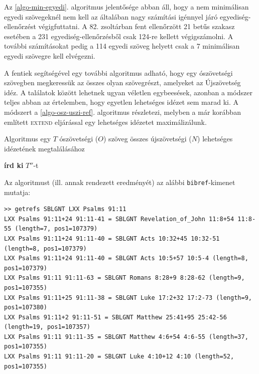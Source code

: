 \documentclass{article}
\begin{document}
Az \ref{algo-min-egyedi}. algoritmus jelentősége abban áll, hogy a nem minimálisan egyedi
szövegeknél nem kell az általában nagy számítási igénnyel járó egyediség-ellenőrzést
végigfuttatni. A 82. zsoltárban fent ellenőrzött 21 betűs szakasz esetében a 231 egyediség-ellenőrzésből
csak 124-re kellett végigszámolni. A további számításokat pedig a 114 egyedi szöveg helyett
csak a 7 minimálisan egyedi szövegre kell elvégezni.

A fentiek segítségével egy további algoritmus adható, hogy egy ószövetségi szövegben megkeressük
az összes olyan szövegrészt, amelyeket az Újszövetség idéz. A találatok között lehetnek
ugyan véletlen egybeesések, azonban a módszer teljes abban az értelemben, hogy egyetlen
lehetséges idézet sem marad ki. A módszert a \ref{algo-osz-uszi-ref}. algoritmus részletezi, melyben a már korábban
említett \textsc{extend} eljárással egy lehetséges idézetet maximálizálunk.

\begin{algorithm}
\caption{Algoritmus egy $T$ ószövetségi ($O$) szöveg összes
újszövetségi ($N$) lehetséges idézetének megtalálásához}
\label{algo-osz-uszi-ref}
\begin{algorithmic}[1]
         \State \textbf{írd ki} {$T''$}-t
        \EndIf
       \EndFor
      \EndFor
    \EndIf
   \EndFor
  \EndFor
 \EndFor
\EndProcedure
\end{algorithmic}
\end{algorithm}

Az algoritmust (ill. annak rendezett eredményét) az alábbi \texttt{bibref}-kimenet mutatja:

\begin{lstlisting}
>> getrefs SBLGNT LXX Psalms 91:11
LXX Psalms 91:11+24 91:11-41 = SBLGNT Revelation_of_John 11:8+54 11:8-55 (length=7, pos1=107379)
LXX Psalms 91:11+24 91:11-40 = SBLGNT Acts 10:32+45 10:32-51 (length=8, pos1=107379)
LXX Psalms 91:11+24 91:11-40 = SBLGNT Acts 10:5+57 10:5-4 (length=8, pos1=107379)
LXX Psalms 91:11 91:11-63 = SBLGNT Romans 8:28+9 8:28-62 (length=9, pos1=107355)
LXX Psalms 91:11+25 91:11-38 = SBLGNT Luke 17:2+32 17:2-73 (length=9, pos1=107380)
LXX Psalms 91:11+2 91:11-51 = SBLGNT Matthew 25:41+95 25:42-56 (length=19, pos1=107357)
LXX Psalms 91:11 91:11-35 = SBLGNT Matthew 4:6+54 4:6-55 (length=37, pos1=107355)
LXX Psalms 91:11 91:11-20 = SBLGNT Luke 4:10+12 4:10 (length=52, pos1=107355)
\end{lstlisting}
\end{document}
